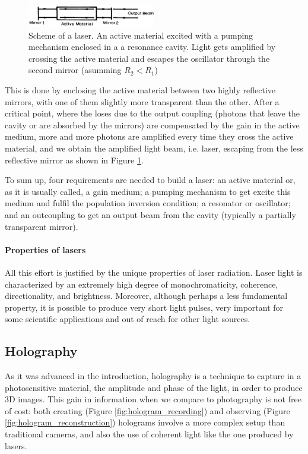 \documentclass[11pt,a4paper]{article}
\begin{document}
\begin{figure}[ht]
\centering
\includegraphics[width=0.5\textwidth]{laser}
\caption{Scheme of a laser. An active material excited with a pumping mechanism enclosed in a a resonance cavity. Light gets amplified by crossing the active material and escapes the oscillator through the second mirror (asumming $R_2<R_1$) \cite{hariharan_2002}}
\label{fig:laser}
\end{figure}

This is done by enclosing the active material between two highly reflective mirrors, with one of them slightly more transparent than the other. After a critical point, where the loses due to the output coupling (photons that leave the cavity or are absorbed by the mirrors) are compensated by the gain in the active medium, more and more photons are amplified every time they cross the active material, and we obtain the amplified light beam, i.e. laser, escaping from the less reflective mirror as shown in Figure \ref{fig:laser}.

To sum up, four requirements are needed to build a laser: an active material or, as it is usually called, a gain medium; a pumping mechanism to get excite this medium and fulfil the population inversion condition; a resonator or oscillator; and an outcoupling to get an output beam from the cavity (typically a partially transparent mirror).

\paragraph{Properties of lasers} All this effort is justified by the unique properties of laser radiation. Laser light is characterized by an extremely high degree of monochromaticity,  coherence, directionality, and brightness. Moreover, although perhaps a less fundamental property, it is possible to produce very short light pulses, very important for some scientific applications and out of reach for other light sources.

\subsection{Holography}\label{sec:Holo}

As it was advanced in the introduction, holography is a technique to capture in a photosensitive material, the amplitude and phase of the light, in order to produce 3D images. This gain in information when we compare to photography is not free of cost: both creating (Figure \ref{fig:hologram_recording}) and observing (Figure \ref{fig:hologram_reconstruction}) holograms involve a more complex setup than traditional cameras, and also the use of coherent light like the one produced by lasers.
\end{document}

